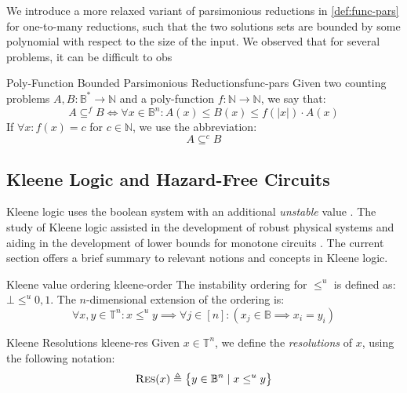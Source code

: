 We introduce a more relaxed variant of parsimonious reductions in \ref{def:func-pars}
for one-to-many reductions, such that the two solutions sets are bounded by some
polynomial with respect to the size of the input. We observed that for several problems,
it can be difficult to obs

\begin{definitionbox}{Poly-Function Bounded Parsimonious Reductions}{func-pars}
    \label{def:func-pars}
    Given two counting problems $A, B : \mathbb{B}^* \to \mathbb{N}$
    and a poly-function $f : \mathbb{N} \to \mathbb{N}$, we
    say that:
    $$
        A \subseteq^f B \iff \forall x \in \mathbb{B}^n:  A(x) \leq B(x) \leq f(|x|) \cdot A(x)
    $$
    If $\forall x : f(x) = c$ for $c \in \mathbb{N}$, we use the abbreviation:
    $$
        A \subseteq^c B
    $$
\end{definitionbox}


\subsection{Kleene Logic and Hazard-Free Circuits}

Kleene logic uses the boolean system with an additional \textit{unstable} value \cite{kleene_IntroductionMetamathematics_2009}.
The study of Kleene logic assisted in
the development of robust physical systems \cite{friedrichs_MetastabilityContainingCircuits_2018} and
aiding in the development of lower bounds for monotone circuits
\cite{eichelberger_HazardDetectionCombinational_1965, ikenmeyer_ComplexityHazardfreeCircuits_2019,ikenmeyer_KarchmerWigdersonGamesHazardfree_2022,  bund_SmallHazardFreeTransducers_2025}.
The current section offers a brief summary to relevant notions and concepts in Kleene logic.

\begin{definitionbox}{Kleene value ordering \cite{mukaidono_BternaryLogicFunction_1972}}{kleene-order}
    The instability ordering for $\leq^u$ is defined as: $\bot \leq^u 0,1$. The $n$-dimensional
    extension of the ordering is:
    $$
        \forall x,y \in \mathbb{T}^n: x \leq^u y \implies \forall j \in [n]: (x_j \in \mathbb{B} \implies x_i = y_i)
    $$
\end{definitionbox}


\begin{definitionbox}{Kleene Resolutions \cite{mukaidono_BternaryLogicFunction_1972, ikenmeyer_ComplexityHazardfreeCircuits_2019}}{kleene-res}
    Given $x \in \mathbb{T}^n$, we define the \textit{resolutions} of $x$, using the following notation:
    $$
        \textnormal{\textsc{Res}}(x) \triangleq \big\{ y \in \mathbb{B}^n \mid x \leq^u y  \big\}
    $$
\end{definitionbox}

